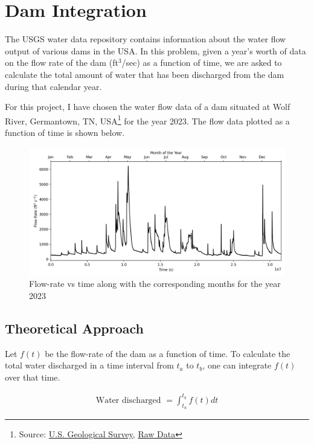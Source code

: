 \newpage
\section{Dam Integration}
The USGS water data repository contains information about the water flow output of various dams in the USA. In this problem, given a year's worth of data on the flow rate of the dam (ft$^3$/sec) as a function of time, we are asked to calculate the total amount of water that has been discharged from the dam during that calendar year.

For this project, I have chosen the water flow data of a dam situated at Wolf River, Germantown, TN, USA\footnote{Source: \href{https://waterdata.usgs.gov/monitoring-location/07031650/}{U.S. Geological Survey}, \href{https://nwis.waterservices.usgs.gov/nwis/iv/?sites=07031650&agencyCd=USGS&startDT=2023-01-01T00:00:00.000-06:00&endDT=2023-12-31T06:00:00.000-00:00&parameterCd=00065&format=rdb}{Raw Data}} for the year 2023. The flow data plotted as a function of time is shown below.

\begin{figure}[H]
    \centering
    \includegraphics[width=1\linewidth]{Figures/2/dams.png}
    \caption{Flow-rate vs time along with the corresponding months for the year 2023}
    \label{dams}
\end{figure}

\subsection{Theoretical Approach}
Let $f(t)$ be the flow-rate of the dam as a function of time. To calculate the total water discharged in a time interval from $t_a$ to $t_b$, one can integrate $f(t)$ over that time.

\begin{align}
    \text{Water discharged } = \int_{t_a}^{t_b} f(t) dt
\end{align}

